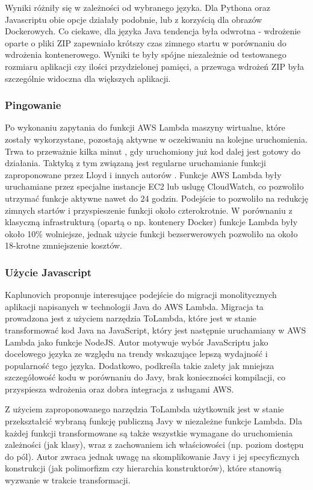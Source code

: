 Wyniki różniły się w zależności od wybranego języka. Dla Pythona oraz Javascriptu obie opcje działały podobnie, lub z korzyścią dla obrazów Dockerowych. 
Co ciekawe, dla języka Java tendencja była odwrotna - wdrożenie oparte o pliki ZIP zapewniało krótszy czas zimnego startu w porównaniu do wdrożenia kontenerowego. 
Wyniki te były spójne niezależnie od testowanego rozmiaru aplikacji czy ilości przydzielonej pamięci, a przewaga wdrożeń ZIP była szczególnie widoczna dla większych aplikacji.

\subsubsection*{Pingowanie}

Po wykonaniu zapytania do funkcji AWS Lambda maszyny wirtualne, które zostały wykorzystane, pozostają aktywne w oczekiwaniu na kolejne uruchomienia. 
Trwa to przeważnie kilka minut \cite{9284261}, gdy uruchomiony już kod dalej jest gotowy do działania.
Taktyką z tym związaną jest regularne uruchamianie funkcji zaproponowane przez Lloyd i innych autorów \cite{8605779}. 
Funkcje AWS Lambda były uruchamiane przez specjalne instancje EC2 lub uslugę CloudWatch, co pozwoliło utrzymać funkcje aktywne nawet do 24 godzin.
Podejście to pozwoliło na redukcję zimnych startów i przyspieszenie funkcji około czterokrotnie.
W porównaniu z klasyczną infrastrukturą (opartą o np. kontenery Docker) funkcje Lambda były około 10\% wolniejsze, jednak użycie funkcji bezserwerowych pozwoliło na około 18-krotne zmniejszenie kosztów. 

\subsubsection*{Użycie Javascript}
Kaplunovich \cite{8844428} proponuje interesujące podejście do migracji monolitycznych aplikacji napisanych w technologii Java do AWS Lambda.
Migracja ta prowadzona jest z użyciem narzędzia ToLambda, które jest w stanie transformować kod Java na JavaScript, który jest następnie uruchamiany w AWS Lambda jako funkcje NodeJS.
Autor motywuje wybór JavaScriptu jako docelowego języka ze względu na trendy wskazujące lepszą wydajność i popularność tego języka.
Dodatkowo, podkreśla takie zalety jak mniejsza szczegółowość kodu w porównaniu do Javy, brak konieczności kompilacji, co przyspiesza wdrożenia oraz dobra integracja z usługami AWS.

Z użyciem zaproponowanego narzędzia ToLambda użytkownik jest w stanie przekształcić wybraną funkcję publiczną Javy w niezależne funkcje Lambda.
Dla każdej funkcji transformowane są także wszystkie wymagane do uruchomienia zależności (jak klasy), wraz z zachowaniem ich właściowości (np. poziom dostępu do pól).
Autor zwraca jednak uwagę na skomplikowanie Javy i jej specyficznych konstrukcji (jak polimorfizm czy hierarchia konstruktorów), które stanowią wyzwanie w trakcie transformacji. 

